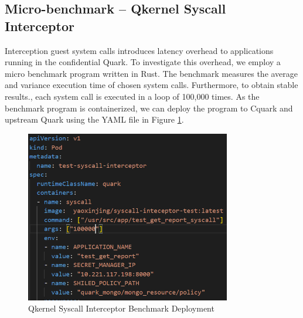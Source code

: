 \subsection{Micro-benchmark – Qkernel Syscall Interceptor}\label{bench_Interceptor}

Interception guest system calls introduces latency overhead to applications running in the confidential Quark.  To investigate this overhead, we employ a micro benchmark program written in Rust\cite*{benchamark_systemcall_intercetion}.  The benchmark measures the average and variance execution 
time of chosen system calls. Furthermore, to obtain stable results., each system call is executed in a loop of 100,000 times. As the benchmark program is containerized, we can deploy the program to Cquark and upstream Quark using the YAML file in Figure \ref{fig:syscall_interceptor_yaml}.
\begin{figure}[H]
    \centering
    \includegraphics[width=0.8\textwidth]{images/perf_system_call_interceptor_yaml.PNG}
    \caption[Qkernel Syscall Interceptor Benchmark Deployment]{Qkernel Syscall Interceptor Benchmark Deployment}
    \label{fig:syscall_interceptor_yaml}
\end{figure}


